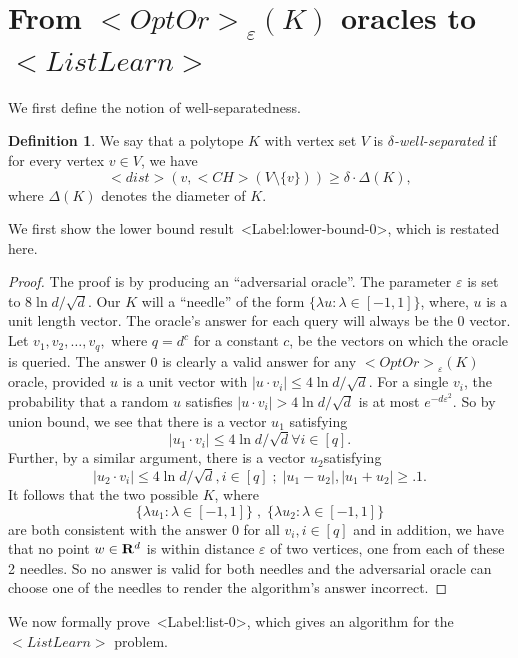 \documentclass[11pt,letterpaper]{article}
\newcounter{note}[section]
\def\mathsf#1{<#1>}%
\def\xspace{}%
\def\Cref#1{<Label:#1>}%
\theoremstyle{definition}
\newtheorem{defn}[theorem]{Definition}
\theoremstyle{remark}
\newcommand{\CH}{{\mathsf {CH}}}
\newcommand{\dst}{{\mathsf{dist}}}
\newcommand{\ListLearn}{\mathsf {ListLearn}\xspace}
\newcommand{\opto}{{\mathsf{OptOr}}}
\begin{document}
\section{From $\opto_\varepsilon(K)$ oracles to $\ListLearn$}
\label{sec:listlearn}



We first define the notion of well-separatedness. 
\begin{defn}
    We say that a polytope $K$ with vertex set $V$ is {\em $\delta$-well-separated} if for every vertex $v \in V$, we have
    $$ \dst(v,\CH(V \setminus \{v\})) \geq \delta \cdot \Delta(K),$$
    where $\Delta(K)$ denotes the diameter of $K$.
\end{defn}

We first show the lower bound result~\Cref{lower-bound-0}, which is restated here. 

\lowerbound*

\begin{proof}
    The proof is by producing an ``adversarial oracle''. The parameter $\varepsilon$ is set to $8 \ln d/\sqrt{d}$. Our $K$ will a ``needle'' of the form $\{\lambda u:\lambda\in [-1,1]\}$, where, $u$ is a unit length vector. The oracle's answer for each query will  always be the 0 vector. Let  $v_1,v_2,\ldots, v_q,$ where $q=d^c$ for a constant $c$, be the vectors on which the oracle is queried. The answer 0 is clearly a valid answer for any $\opto_\varepsilon(K)$ oracle,  provided  $u$ is a unit vector with $|u\cdot v_i|\leq 4\ln d/\sqrt d$. For a single $v_i$, the probability that a random $u$ satisfies $|u\cdot v_i|>4\ln d/\sqrt d$ is at most $e^{-d\varepsilon^2}$. So by union bound, we see that there is a vector $u_1$ satisfying 
    $$|u_1\cdot v_i|\leq 4\ln d/\sqrt d\forall i\in [q].$$
    Further, by a similar argument, there is a vector $u_2$satisfying
    $$|u_2\cdot v_i|\leq 4\ln d/\sqrt d, i\in [q]\; ;\; |u_1-u_2|,|u_1+u_2|\geq .1.$$ It follows that the two possible $K$, where 
    $$\{ \lambda u_1:\lambda\in [-1,1]\}\; ,\; \{ \lambda u_2:\lambda\in [-1,1]\}$$
are both consistent with the answer 0 for all $v_i,i\in [q]$ and in addition, we have that no point $w\in {\bf R}^d$ is within distance $\varepsilon$ of two vertices, one from each of these 2 needles. So no answer is valid for both needles and the adversarial oracle can choose one of the needles to render the algorithm's answer incorrect.
\end{proof}

We now formally prove~\Cref{list-0}, which gives an algorithm for the $\ListLearn$ problem. 
\end{document}
